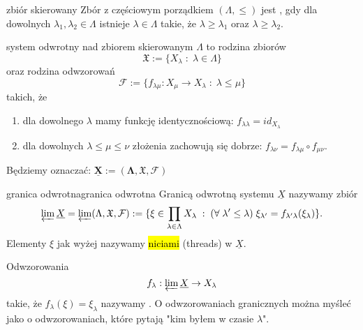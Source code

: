 \begin{definition}{zbiór skierowany}{}
  Zbór z częściowym porządkiem $(\Lambda, \leq)$ jest , gdy dla dowolnych $\lambda_1,\lambda_2\in\Lambda$ istnieje $\lambda\in\Lambda$ takie, że $\lambda\geq \lambda_1$ oraz $\lambda\geq \lambda_2$.
\end{definition}


\begin{definition}{system odwrotny}{}
   nad zbiorem skierowanym $\Lambda$ to rodzina zbiorów 
  $$\mathfrak{X}:=\{X_\lambda\;:\;\lambda\in\Lambda \}$$
  oraz rodzina odwzorowań
  $$\mathcal{F}:=\{f_{\lambda\mu}:X_\mu\to X_\lambda\;:\;\lambda\leq\mu \}$$
  takich, że 
  \begin{enumerate}
    \item dla dowolnego $\lambda$ mamy funkcję identycznościową: $f_{\lambda\lambda}=id_{X_\lambda}$
    \item dla dowolnych $\lambda\leq\mu\leq\nu$ złożenia zachowują się dobrze: $f_{\lambda\nu}=f_{\lambda\mu}\circ f_{\mu\nu}$.
  \end{enumerate}
\end{definition}

Będziemy oznaczać: $\boldsymbol{\underline{X}:=(\Lambda, \mathfrak{X}, \mathcal{F})}$

\begin{definition}{granica odwrotna}{granica odwrotna}
  Granicą odwrotną systemu $\underline{X}$ nazywamy zbiór
  $$\varprojlim\underline{X}=\varprojlim(\Lambda, \mathfrak{X}, \mathcal{F}):=\{\xi\in\prod_{\lambda\in\Lambda}X_\lambda\;:\;(\forall\;\lambda'\leq\lambda)\;\xi_{\lambda'}=f_{\lambda'\lambda}(\xi_\lambda)\}.$$
  Elementy $\xi$ jak wyżej nazywamy \hl{niciami} (threads) w $\underline{X}$.
\end{definition}

Odwzorowania 
$$f_\lambda:\varprojlim\underline{X}\to X_\lambda$$ 
takie, że $f_\lambda(\xi)=\xi_\lambda$ nazywamy .
O odwzorowaniach granicznych można myśleć jako o odwzorowaniach, które pytają "kim byłem w czasie $\lambda$".

\begin{center}
\end{center}

